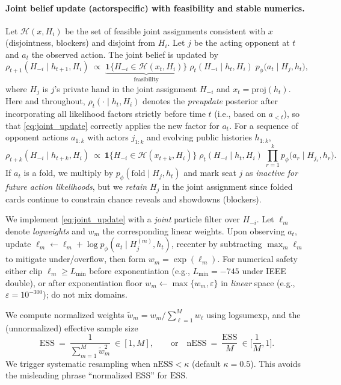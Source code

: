 \documentclass[10pt]{article}
\newcommand{\1}{\mathbf{1}}
\theoremstyle{plain}
\begin{document}
\paragraph{Joint belief update (actor\textendash specific) with feasibility and stable numerics.}
Let $\mathcal{H}(x,H_i)$ be the set of feasible joint assignments consistent with $x$ (disjointness, blockers) and disjoint from $H_i$. Let $j$ be the acting opponent at $t$ and $a_t$ the observed action. The joint belief is updated by
\begin{equation}
\label{eq:joint_update}
\rho_{t+1}(H_{-i}\mid h_{t+1},H_i) \;\propto\; \underbrace{\1\{H_{-i}\in \mathcal{H}(x_t,H_i)\}}_{\text{feasibility}}\;\rho_t(H_{-i}\mid h_t,H_i)\; p_\phi\!\big(a_t \mid H_j, h_t\big),
\end{equation}
where $H_j$ is $j$’s private hand in the joint assignment $H_{-i}$ and $x_t=\mathrm{proj}(h_t)$. Here and throughout, $\rho_t(\cdot\mid h_t,H_i)$ denotes the \emph{pre\textendash update} posterior after incorporating all likelihood factors strictly before time $t$ (i.e., based on $a_{<t}$), so that \eqref{eq:joint_update} correctly applies the new factor for $a_t$. For a sequence of opponent actions $a_{1:k}$ with actors $j_{1:k}$ and evolving public histories $h_{1:k}$,
\begin{equation}
\label{eq:multi_update}
\rho_{t+k}(H_{-i}\mid h_{t+k},H_i)\ \propto\ \1\{H_{-i}\in \mathcal{H}(x_{t+k},H_i)\}\;\rho_t(H_{-i}\mid h_t,H_i)\ \prod_{r=1}^k p_\phi\!\big(a_r\mid H_{j_r},h_r\big).
\end{equation}
If $a_t$ is a fold, we multiply by $p_\phi(\mathrm{fold}\mid H_j,h_t)$ and mark seat $j$ as \emph{inactive for future action likelihoods}, but we \emph{retain} $H_j$ in the joint assignment since folded cards continue to constrain chance reveals and showdowns (blockers).

We implement \eqref{eq:joint_update} with a \emph{joint} particle filter over $H_{-i}$. Let $\ell_m$ denote \emph{log\textendash weights} and $w_m$ the corresponding linear weights. Upon observing $a_t$, update $\ell_m\leftarrow \ell_m+\log p_\phi(a_t\mid H_j^{(m)},h_t)$, recenter by subtracting $\max_m \ell_m$ to mitigate under/overflow, then form $w_m=\exp(\ell_m)$. For numerical safety either clip $\ell_m\ge L_{\min}$ before exponentiation (e.g., $L_{\min}=-745$ under IEEE double), or after exponentiation floor $w_m\leftarrow \max\{w_m,\varepsilon\}$ in \emph{linear} space (e.g., $\varepsilon=10^{-300}$); do not mix domains.

We compute normalized weights $\tilde w_m=w_m/\sum_{\ell=1}^M w_\ell$ using log\textendash sum\textendash exp, and the (unnormalized) effective sample size
\[
\mathrm{ESS}\ =\ \frac{1}{\sum_{m=1}^M \tilde w_m^2}\ \in [1,M],\qquad \text{or}\quad \mathrm{nESS}\ =\ \frac{\mathrm{ESS}}{M}\ \in\Big[\frac{1}{M},1\Big].
\]
We trigger systematic resampling when $\mathrm{nESS}<\kappa$ (default $\kappa=0.5$). This avoids the misleading phrase ``normalized ESS'' for $\mathrm{ESS}$.
\end{document}
